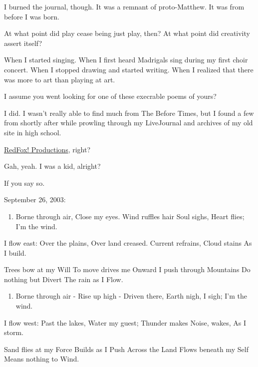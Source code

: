 I burned the journal, though. It was a remnant of proto-Matthew. It was from before I was born.

\begin{ally}
At what point did play cease being just play, then? At what point did creativity assert itself?
\end{ally}
When I started singing. When I first heard Madrigals sing during my first choir concert. When I stopped drawing and started writing. When I realized that there was more to art than playing at art.
\newpage

\begin{ally}
I assume you went looking for one of these execrable poems of yours?
\end{ally}
I did. I wasn't really able to find much from The Before Times, but I found a few from shortly after while prowling through my LiveJournal and archives of my old site in high school.

\begin{ally}
\href{https://web.archive.org/web/2005*/http://ranna.babylonia.flatirons.org/}{RedFox! Productions}, right?
\end{ally}
Gah, yeah. I was a kid, alright?

\begin{ally}
If you say so.
\end{ally}
September 26, 2003:

\begin{enumerate}
\def\labelenumi{\Roman{enumi}.}
\tightlist
\item
  Borne through air, Close my eyes. Wind ruffles hair Soul sighs, Heart flies; I'm the wind.
\end{enumerate}

I flow east: Over the plains, Over land creased. Current refrains, Cloud stains As I build.

Trees bow at my Will To move drives me Onward I push through Mountains Do nothing but Divert The rain as I Flow.

\begin{enumerate}
\def\labelenumi{\Roman{enumi}.}
\setcounter{enumi}{1}
\tightlist
\item
  Borne through air - Rise up high - Driven there, Earth nigh, I sigh; I'm the wind.
\end{enumerate}

I flow west: Past the lakes, Water my guest; Thunder makes Noise, wakes, As I storm.

Sand flies at my Force Builds as I Push Across the Land Flows beneath my Self Means nothing to Wind.

